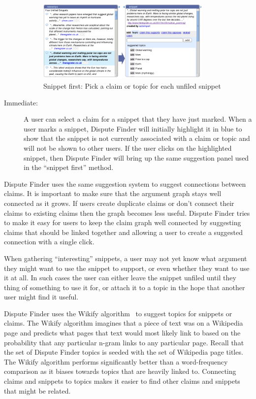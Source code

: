 \documentclass{www2010-submission}
\begin{document}
\begin{description}
\begin{figure}[tb]
	\begin{center}
	\includegraphics[width=8.5cm]{../screenshots/v2_sniptopic.png}
	\caption{Snippet first: Pick a claim or topic for each unfiled snippet}
	\label{sniptopic}
	\end{center}
\end{figure}

\item[Immediate:] A user can select a claim for a snippet that they have just marked. When a user marks a snippet, Dispute Finder will initially highlight it in blue to show that the snippet is not currently associated with a claim or topic and will not be shown to other users. If the user clicks on the highlighted snippet, then Dispute Finder will bring up the same suggestion panel used in the ``snippet first'' method.
\end{description}

Dispute Finder uses the same suggestion system to suggest connections between claims. It is important to make sure that the argument graph stays well connected as it grows. If users create duplicate claims or don't connect their claims to existing claims then the graph becomes less useful. Dispute Finder tries to make it easy for users to keep the claim graph well connected by suggesting claims that should be linked together and allowing a user to create a suggested connection with a single click. 

When gathering ``interesting'' snippets, a user may not yet know what argument they might want to use the snippet to support, or even whether they want to use it at all. In such cases the user can either leave the snippet unfiled until they thing of something to use it for, or attach it to a topic in the hope that another user might find it useful.

Dispute Finder uses the Wikify algorithm~\cite{Mihalcea2007} to suggest topics for snippets or claims. The Wikify algorithm imagines that a piece of text was on a Wikipedia page and predicts what pages that text would most likely link to based on the probability that any particular n-gram links to any particular page. Recall that the set of Dispute Finder topics is seeded with the set of Wikipedia page titles. The Wikify algorithm performs significantly better than a word-frequency comparison as it biases towards topics that are heavily linked to. Connecting claims and snippets to topics makes it easier to find other claims and snippets that might be related.
\end{document}
